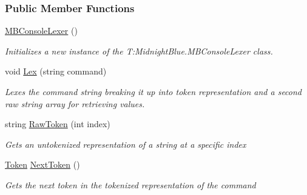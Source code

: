 \subsubsection*{Public Member Functions}
\begin{DoxyCompactItemize}
\item 
\hyperlink{class_m_b2_d_1_1_m_b_console_lexer_aa78375766c0612494a148a55814b4b7e}{M\+B\+Console\+Lexer} ()
\begin{DoxyCompactList}\small\item\em Initializes a new instance of the T\+:\+Midnight\+Blue.\+M\+B\+Console\+Lexer class. \end{DoxyCompactList}\item 
void \hyperlink{class_m_b2_d_1_1_m_b_console_lexer_a6c09fcdb1a36eff50201b9f5469bd55c}{Lex} (string command)
\begin{DoxyCompactList}\small\item\em Lexes the command string breaking it up into token representation and a second raw string array for retrieving values. \end{DoxyCompactList}\item 
string \hyperlink{class_m_b2_d_1_1_m_b_console_lexer_a9f08e0a2739eb027f6b8c46abe67f647}{Raw\+Token} (int index)
\begin{DoxyCompactList}\small\item\em Gets an untokenized representation of a string at a specific index \end{DoxyCompactList}\item 
\hyperlink{namespace_m_b2_d_ab170e7e7db86e5ccb0ae156c0d9a6002}{Token} \hyperlink{class_m_b2_d_1_1_m_b_console_lexer_ab083ced0d68a7f7278fbb462a9c60410}{Next\+Token} ()
\begin{DoxyCompactList}\small\item\em Gets the next token in the tokenized representation of the command \end{DoxyCompactList}\end{DoxyCompactItemize}
